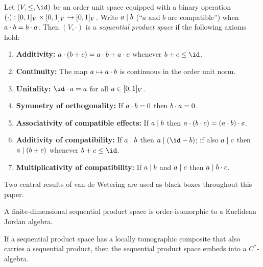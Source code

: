 \documentclass[11pt]{article}
\begin{document}
\begin{definition}
\label{def:sp}
  Let $(V, \leq, \id)$ be an order unit space equipped with a binary
  operation $(\cdot) : \eff{V} \times \eff{V} \to \eff{V}$.  Write
  $a \compatible b$ (``$a$ and $b$ are compatible'') when
  $\sp{a}{b} = \sp{b}{a}$.  Then $(V, \cdot)$ is a \emph{sequential
  product space} if the following axioms hold:
  \begin{enumerate}[label=\textup{(S\arabic*)},leftmargin=3em]
    \item\label{ax:S1} \textbf{Additivity:}
      $\sp{a}{(b+c)} = \sp{a}{b} + \sp{a}{c}$ whenever
      $b + c \leq \id$.
    \item\label{ax:S2} \textbf{Continuity:}
      The map $a \mapsto \sp{a}{b}$ is continuous in the order unit
      norm.
    \item\label{ax:S3} \textbf{Unitality:}
      $\sp{\id}{a} = a$ for all $a \in \eff{V}$.
    \item\label{ax:S4} \textbf{Symmetry of orthogonality:}
      If $\sp{a}{b} = 0$ then $\sp{b}{a} = 0$.
    \item\label{ax:S5} \textbf{Associativity of compatible effects:}
      If $a \compatible b$ then
      $\sp{a}{(\sp{b}{c})} = \sp{(\sp{a}{b})}{c}$.
    \item\label{ax:S6} \textbf{Additivity of compatibility:}
      If $a \compatible b$ then $a \compatible (\id - b)$; if also
      $a \compatible c$ then $a \compatible (b + c)$ whenever
      $b + c \leq \id$.
    \item\label{ax:S7} \textbf{Multiplicativity of compatibility:}
      If $a \compatible b$ and $a \compatible c$ then
      $a \compatible \sp{b}{c}$.
  \end{enumerate}
\end{definition}

Two central results of van de Wetering are used as black boxes
throughout this paper.

\begin{theorem}\label{thm:vdw1}
  A finite-dimensional sequential product space is order-isomorphic
  to a Euclidean Jordan algebra.
\end{theorem}

\begin{theorem}\label{thm:vdw3}
  If a sequential product space has a locally tomographic composite
  that also carries a sequential product, then the sequential product
  space embeds into a $C^{*}$-algebra.
\end{theorem}
\end{document}
